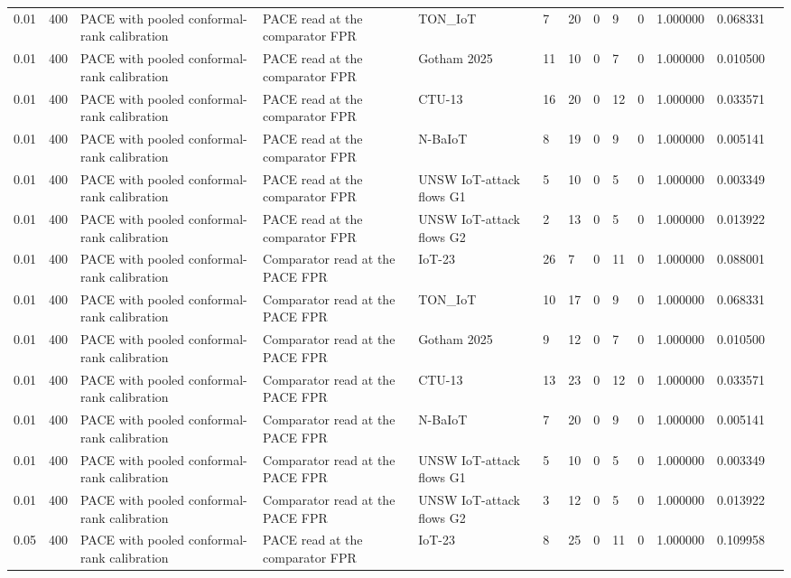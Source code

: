 \begin{tabular}{lllllllllllll}
0.01 & 400 & PACE with pooled conformal-rank calibration & PACE read at the comparator FPR & TON\_IoT & 7 & 20 & 0 & 9 & 0 & 1.000000 & 0.068331 &  \\
0.01 & 400 & PACE with pooled conformal-rank calibration & PACE read at the comparator FPR & Gotham 2025 & 11 & 10 & 0 & 7 & 0 & 1.000000 & 0.010500 &  \\
0.01 & 400 & PACE with pooled conformal-rank calibration & PACE read at the comparator FPR & CTU-13 & 16 & 20 & 0 & 12 & 0 & 1.000000 & 0.033571 &  \\
0.01 & 400 & PACE with pooled conformal-rank calibration & PACE read at the comparator FPR & N-BaIoT & 8 & 19 & 0 & 9 & 0 & 1.000000 & 0.005141 &  \\
0.01 & 400 & PACE with pooled conformal-rank calibration & PACE read at the comparator FPR & UNSW IoT-attack flows G1 & 5 & 10 & 0 & 5 & 0 & 1.000000 & 0.003349 &  \\
0.01 & 400 & PACE with pooled conformal-rank calibration & PACE read at the comparator FPR & UNSW IoT-attack flows G2 & 2 & 13 & 0 & 5 & 0 & 1.000000 & 0.013922 &  \\
0.01 & 400 & PACE with pooled conformal-rank calibration & Comparator read at the PACE FPR & IoT-23 & 26 & 7 & 0 & 11 & 0 & 1.000000 & 0.088001 &  \\
0.01 & 400 & PACE with pooled conformal-rank calibration & Comparator read at the PACE FPR & TON\_IoT & 10 & 17 & 0 & 9 & 0 & 1.000000 & 0.068331 &  \\
0.01 & 400 & PACE with pooled conformal-rank calibration & Comparator read at the PACE FPR & Gotham 2025 & 9 & 12 & 0 & 7 & 0 & 1.000000 & 0.010500 &  \\
0.01 & 400 & PACE with pooled conformal-rank calibration & Comparator read at the PACE FPR & CTU-13 & 13 & 23 & 0 & 12 & 0 & 1.000000 & 0.033571 &  \\
0.01 & 400 & PACE with pooled conformal-rank calibration & Comparator read at the PACE FPR & N-BaIoT & 7 & 20 & 0 & 9 & 0 & 1.000000 & 0.005141 &  \\
0.01 & 400 & PACE with pooled conformal-rank calibration & Comparator read at the PACE FPR & UNSW IoT-attack flows G1 & 5 & 10 & 0 & 5 & 0 & 1.000000 & 0.003349 &  \\
0.01 & 400 & PACE with pooled conformal-rank calibration & Comparator read at the PACE FPR & UNSW IoT-attack flows G2 & 3 & 12 & 0 & 5 & 0 & 1.000000 & 0.013922 &  \\
0.05 & 400 & PACE with pooled conformal-rank calibration & PACE read at the comparator FPR & IoT-23 & 8 & 25 & 0 & 11 & 0 & 1.000000 & 0.109958 &  \\

\end{tabular}
